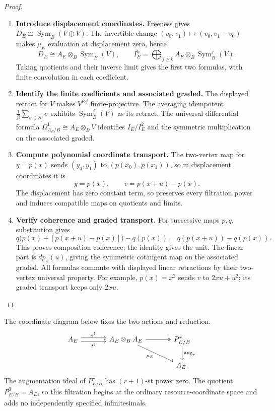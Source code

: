 \documentclass[11pt,a4paper]{article}
\numberwithin{algorithm}{section}
\numberwithin{equation}{section}
\theoremstyle{definition}
\theoremstyle{remark}
\theoremstyle{plain}
\newcommand{\Sym}{\operatorname{Sym}}
\theoremstyle{definition}
\theoremstyle{plain}
\begin{document}
\begin{proof}\leavevmode
\begin{enumerate}[leftmargin=*,align=left]
\item \textbf{Introduce displacement coordinates.}
Freeness gives $D_E\cong\Sym_B(V\oplus V)$.
The invertible change $(v_0,v_1)\mapsto(v_0,v_1-v_0)$ makes
$\mu_E$ evaluation at displacement zero, hence
\[
 D_E\cong A_E\otimes_B\Sym_B(V),\qquad
 I_E^k=\bigoplus_{j\ge k}A_E\otimes_B\Sym_B^j(V).
\]
Taking quotients and their inverse limit gives the first two
formulas, with finite convolution in each coefficient.

\item \textbf{Identify the finite coefficients and associated graded.}
The displayed retract for $V$ makes $V^{\otimes j}$ finite-projective.
The averaging idempotent $\frac1{j!}\sum_{\sigma\in S_j}\sigma$
exhibits $\Sym_B^j(V)$ as its retract. The universal differential
formula $\Omega^1_{A_E/B}\cong A_E\otimes_BV$ identifies
$I_E/I_E^2$ and the symmetric multiplication on the associated graded.

\item \textbf{Compute polynomial coordinate transport.}
The two-vertex map for $y=p(x)$ sends $(y_0,y_1)$ to
$(p(x_0),p(x_1))$, so in displacement coordinates it is
\begin{equation}\label{eq:principal-parts-taylor-naturality}
 y=p(x),\qquad v=p(x+u)-p(x).
\end{equation}
The displacement has zero constant term, so preserves every
filtration power and induces compatible maps on quotients and limits.

\item \textbf{Verify coherence and graded transport.}
For successive maps $p,q$, substitution gives
\[
 q\bigl(p(x)+[p(x+u)-p(x)]\bigr)-q(p(x))
       =q(p(x+u))-q(p(x)).
\]
This proves composition coherence; the identity gives the unit.
The linear part is $dp_x(u)$, giving the symmetric cotangent map
on the associated graded. All formulas commute with displayed
linear retractions by their two-vertex universal property.
For example, $p(x)=x^2$ sends $v$ to $2xu+u^2$; its graded
transport keeps only $2xu$.
\end{enumerate}
\end{proof}


The coordinate diagram below fixes the two actions and reduction.
\begin{equation}\label{eq:diagonal-diagram}
\begin{tikzcd}[column sep=large]
 A_E \arrow[r,shift left=.6ex,"{s^\sharp}"]
     \arrow[r,shift right=.6ex,swap,"{t^\sharp}"]
 & A_E\otimes_BA_E \arrow[r,two heads] \arrow[dr,swap,"{\mu_E}"]
 & P^r_{E/B} \arrow[d,"{\operatorname{aug}_r}"]\\
 && A_E .
\end{tikzcd}
\end{equation}
The augmentation ideal of $P^r_{E/B}$ has $(r+1)$-st power zero.
The quotient $P^0_{E/B}=A_E$, so this filtration begins at the
ordinary resource-coordinate space and adds no independently
specified infinitesimals.
\end{document}
